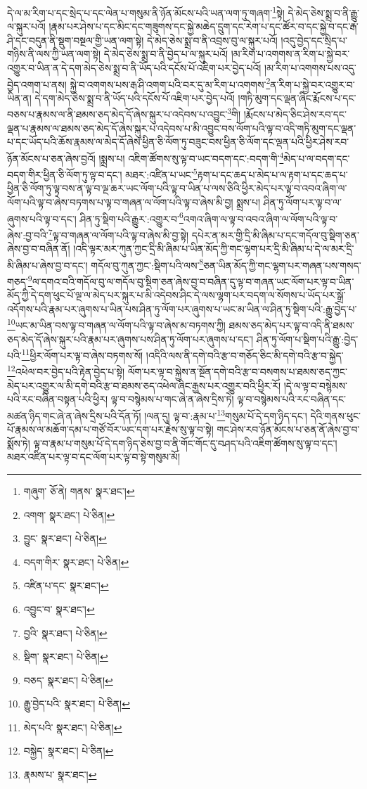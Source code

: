 དེ་ལ་མ་རིག་པ་དང་སྲེད་པ་དང་ལེན་པ་གསུམ་ནི་ཉོན་མོངས་པའི་ཡན་ལག་ཏུ་གཞག་\footnote{གཞུག་  ཅོ་ནེ། གནས་  སྣར་ཐང་། }སྟེ། དེ་མེད་ཅེས་སྨྲ་བ་ནི་རྒྱུ་ལ་སྐུར་པའོ། །རྣམ་པར་ཤེས་པ་དང་མིང་དང་གཟུགས་དང་སྐྱེ་མཆེད་དྲུག་དང་རེག་པ་དང་ཚོར་བ་དང་སྐྱེ་བ་དང་རྒ་ཤི་དང་བདུན་ནི་སྡུག་བསྔལ་གྱི་ཡན་ལག་སྟེ། དེ་མེད་ཅེས་སྨྲ་བ་ནི་འབྲས་བུ་ལ་སྐུར་པའོ། །འདུ་བྱེད་དང་སྲིད་པ་གཉིས་ནི་ལས་ཀྱི་ཡན་ལག་སྟེ། དེ་མེད་ཅེས་སྨྲ་བ་ནི་བྱེད་པ་ལ་སྐུར་པའོ། །མ་རིག་པ་འགགས་ན་རིག་པ་སྐྱེ་བར་འགྱུར་བ་ཡིན་ན་དེ་དག་མེད་ཅེས་སྨྲ་བ་ནི་ཡོད་པའི་དངོས་པོ་འཇིག་པར་བྱེད་པའོ། །མ་རིག་པ་འགགས་པས་འདུ་བྱེད་འགག་པ་ནས། སྐྱེ་བ་འགགས་པས་རྒ་ཤི་འགག་པའི་བར་དུ་མ་རིག་པ་འགགས་\footnote{འགག་  སྣར་ཐང་།  པེ་ཅིན། }ན་རིག་པ་སྐྱེ་བར་འགྱུར་བ་ཡིན་ན། དེ་དག་མེད་ཅེས་སྨྲ་བ་ནི་ཡོད་པའི་དངོས་པོ་འཇིག་པར་བྱེད་པའོ། །གཏི་མུག་དང་ལྡན་ཞིང་རྨོངས་པ་དང་བཅས་པ་རྣམས་ལ་ནི་ཐམས་ཅད་མེད་དོ་ཞེས་སྐུར་པ་འདེབས་པ་འབྱུང་\footnote{བྱུང་  སྣར་ཐང་།  པེ་ཅིན། }གི། །རྨོངས་པ་མེད་ཅིང་ཤེས་རབ་དང་ལྡན་པ་རྣམས་ལ་ཐམས་ཅད་མེད་དོ་ཞེས་སྐུར་པ་འདེབས་པ་མི་འབྱུང་བས་ལོག་པའི་ལྟ་བ་འདི་གཏི་མུག་དང་ལྡན་པ་དང་ཡོད་པའི་ཆོས་རྣམས་ལ་མེད་དོ་ཞེས་ཕྱིན་ཅི་ལོག་ཏུ་བཟུང་བས་ཕྱིན་ཅི་ལོག་དང་ལྡན་པའི་ཕྱིར་ཤེས་རབ་ཉོན་མོངས་པ་ཅན་ཞེས་བྱའོ། །སྨྲས་པ། འཇིག་ཚོགས་སུ་ལྟ་བ་ཡང་བདག་དང་:བདག་གི་\footnote{བདག་གིར་  སྣར་ཐང་།  པེ་ཅིན། }མེད་པ་ལ་བདག་དང་བདག་གིར་ཕྱིན་ཅི་ལོག་ཏུ་ལྟ་བ་དང་། མཐར་:འཛིན་པ་ཡང་\footnote{འཛིན་པ་དང་  སྣར་ཐང་། }རྟག་པ་དང་ཆད་པ་མེད་པ་ལ་རྟག་པ་དང་ཆད་པ་ཕྱིན་ཅི་ལོག་ཏུ་ལྟ་བས་ན་ལྟ་བ་ལྔ་ཆར་ཡང་ལོག་པའི་ལྟ་བ་ཡིན་པ་ལས་ཅིའི་ཕྱིར་མེད་པར་ལྟ་བ་འབའ་ཞིག་ལ་ལོག་པའི་ལྟ་བ་ཞེས་བཏགས་པ་ལྟ་བ་གཞན་ལ་ལོག་པའི་ལྟ་བ་ཞེས་མི་བྱ། སྨྲས་པ། ཤིན་ཏུ་ལོག་པར་ལྟ་བ་ལ་ཞུགས་པའི་ལྟ་བ་དང་། ཤིན་ཏུ་སྡིག་པའི་རྒྱུར་:འགྱུར་བ་\footnote{འབྱུང་བ་  སྣར་ཐང་། }འགའ་ཞིག་ལ་ལྟ་བ་འབའ་ཞིག་ལ་ལོག་པའི་ལྟ་བ་ཞེས་:བྱ་བའི་\footnote{བྱའི་  སྣར་ཐང་།  པེ་ཅིན། }ལྟ་བ་གཞན་ལ་ལོག་པའི་ལྟ་བ་ཞེས་མི་བྱ་སྟེ། དཔེར་ན་མར་གྱི་དྲི་མི་ཞིམ་པ་དང་གདོལ་བུ་སྡིག་ཅན་ཞེས་བྱ་བ་བཞིན་ནོ། །འདི་ལྟར་མར་ཀུན་ཀྱང་དྲི་མི་ཞིམ་པ་ཡིན་མོད་ཀྱི་གང་ལྷག་པར་དྲི་མི་ཞིམ་པ་དེ་ལ་མར་དྲི་མི་ཞིམ་པ་ཞེས་བྱ་བ་དང་། གདོལ་བུ་ཀུན་ཀྱང་:སྡིག་པའི་ལས་\footnote{སྡིག་  སྣར་ཐང་།  པེ་ཅིན། }ཅན་ཡིན་མོད་ཀྱི་གང་ལྷག་པར་གཞན་པས་གསད་གཅད་\footnote{བཅད་  སྣར་ཐང་།  པེ་ཅིན། }ལ་དགའ་བའི་གདོལ་བུ་ལ་གདོལ་བུ་སྡིག་ཅན་ཞེས་བྱ་བ་བཞིན་དུ་ལྟ་བ་གཞན་ཡང་ལོག་པར་ལྟ་བ་ཡིན་མོད་ཀྱི་དེ་དག་ཕུང་པོ་ལྔ་ལ་མེད་པར་སྐུར་པ་མི་འདེབས་ཤིང་དེ་ལས་ལྷག་པར་བདག་ལ་སོགས་པ་ཡོད་པར་སྒྲོ་འདོགས་པའི་རྣམ་པར་ཞུགས་པ་ཡིན་པས་ཤིན་ཏུ་ལོག་པར་ཞུགས་པ་ཡང་མ་ཡིན་ལ་ཤིན་ཏུ་སྡིག་པའི་:རྒྱུ་བྱེད་པ་\footnote{རྒྱུ་བྱེད་པའི་  སྣར་ཐང་།  པེ་ཅིན། }ཡང་མ་ཡིན་བས་ལྟ་བ་གཞན་ལ་ལོག་པའི་ལྟ་བ་ཞེས་མ་བཏགས་ཀྱི། ཐམས་ཅད་མེད་པར་ལྟ་བ་འདི་ནི་ཐམས་ཅད་མེད་དོ་ཞེས་སྐུར་པའི་རྣམ་པར་ཞུགས་པས་ཤིན་ཏུ་ལོག་པར་ཞུགས་པ་དང་། ཤིན་ཏུ་ལོག་པ་སྡིག་པའི་རྒྱུ་:བྱེད་པའི་\footnote{མེད་པའི་  སྣར་ཐང་།  པེ་ཅིན། }ཕྱིར་ལོག་པར་ལྟ་བ་ཞེས་བཏགས་སོ། །འདིའི་ལས་ནི་དགེ་བའི་རྩ་བ་གཅོད་ཅིང་མི་དགེ་བའི་རྩ་བ་སྐྱེད་\footnote{བསྐྱེད་  སྣར་ཐང་།  པེ་ཅིན། }འཕེལ་བར་བྱེད་པའི་རྟེན་བྱེད་པ་སྟེ། ལོག་པར་ལྟ་བ་སྐྱེས་ན་སྔོན་དགེ་བའི་རྩ་བ་བསགས་པ་ཐམས་ཅད་ཀྱང་མེད་པར་འགྱུར་ལ་མི་དགེ་བའི་རྩ་བ་ཐམས་ཅད་འཕེལ་ཞིང་རྒྱས་པར་འགྱུར་བའི་ཕྱིར་རོ། །དེ་ལ་ལྟ་བ་བསྙེམས་པའི་རང་བཞིན་བསྟན་པའི་ཕྱིར། ལྟ་བ་བསྙེམས་པ་གང་ཞེ་ན་ཞེས་དྲིས་ཏེ། ལྟ་བ་བསྙེམས་པའི་རང་བཞིན་དང་མཚན་ཉིད་གང་ཞེ་ན་ཞེས་དྲིས་པའི་དོན་ཏོ། །ལན་དུ། ལྟ་བ་:རྣམ་པ་\footnote{རྣམས་པ་  སྣར་ཐང་། }གསུམ་པོ་དེ་དག་ཉིད་དང་། དེའི་གནས་ཕུང་པོ་རྣམས་ལ་མཆོག་དམ་པ་གཙོ་བོར་ཡང་དག་པར་རྗེས་སུ་ལྟ་བ་སྟེ། གང་ཤེས་རབ་ཉོན་མོངས་པ་ཅན་ནོ་ཞེས་བྱ་བ་སྨོས་ཏེ། ལྟ་བ་རྣམ་པ་གསུམ་པོ་དེ་དག་ཉིད་ཅེས་བྱ་བ་ནི་གོང་གོང་དུ་བཤད་པའི་འཇིག་ཚོགས་སུ་ལྟ་བ་དང་། མཐར་འཛིན་པར་ལྟ་བ་དང་ལོག་པར་ལྟ་བ་སྟེ་གསུམ་མོ། 
